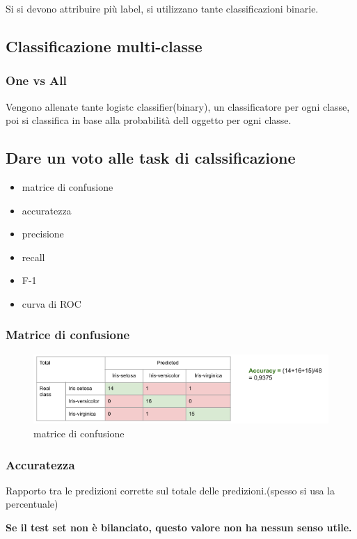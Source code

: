 Si si devono attribuire più label, si utilizzano tante classificazioni binarie.

\subsection{Classificazione multi-classe}
\subsubsection{One vs All}
Vengono allenate tante logistc classifier(binary), un classificatore per
ogni classe, poi si classifica in base alla probabilità dell oggetto per ogni classe.



\subsection{Dare un voto alle task di calssificazione}
\begin{itemize}
    \item matrice di confusione
    \item accuratezza
    \item precisione
    \item recall
    \item F-1
    \item curva di ROC
\end{itemize}

\subsubsection{Matrice di confusione}


\begin{figure}[H]
    \centering
    \includegraphics[width=0.5\linewidth]{imgs/matrice-di-confusione}
    \caption{matrice di confusione}
    \label{fig:conf_matrix}
\end{figure}

\subsubsection{Accuratezza}
Rapporto tra le predizioni corrette sul totale delle predizioni.(spesso si usa
la percentuale)


\textbf{Se il test set non è bilanciato, questo valore non ha nessun senso utile.}

